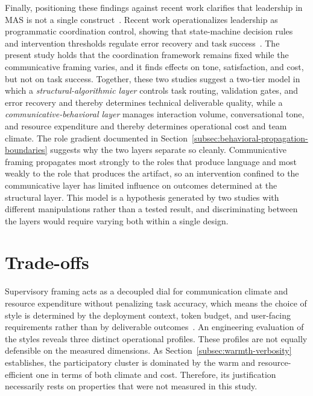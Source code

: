 Finally, positioning these findings against recent work clarifies that leadership in \ac{MAS} is not a single construct~\cite{kwak2026leadershipcoordinationcontrolbehavioral}.
Recent work operationalizes leadership as programmatic coordination control, showing that state-machine decision rules and intervention thresholds regulate error recovery and task success~\cite{kwak2026leadershipcoordinationcontrolbehavioral}.
The present study holds that the coordination framework remains fixed while the communicative framing varies, and it finds effects on tone, satisfaction, and cost, but not on task success.
Together, these two studies suggest a two-tier model in which a \emph{structural-algorithmic layer} controls task routing, validation gates, and error recovery and thereby determines technical deliverable quality, while a \emph{communicative-behavioral layer} manages interaction volume, conversational tone, and resource expenditure and thereby determines operational cost and team climate.
The role gradient documented in Section~\ref{subsec:behavioral-propagation-boundaries} suggests why the two layers separate so cleanly. 
Communicative framing propagates most strongly to the roles that produce language and most weakly to the role that produces the artifact, so an intervention confined to the communicative layer has limited influence on outcomes determined at the structural layer.
This model is a hypothesis generated by two studies with different manipulations rather than a tested result, and discriminating between the layers would require varying both within a single design.

\section{Trade-offs}
\label{sec:trade-offs}

Supervisory framing acts as a decoupled dial for communication climate and resource expenditure without penalizing task accuracy, which means the choice of style is determined by the deployment context, token budget, and user-facing requirements rather than by deliverable outcomes~\cite{kwak2026leadershipcoordinationcontrolbehavioral, zhang2024cutcrapeconomicalcommunication}.
An engineering evaluation of the styles reveals three distinct operational profiles.
These profiles are not equally defensible on the measured dimensions.
As Section~\ref{subsec:warmth-verbosity} establishes, the participatory cluster is dominated by the warm and resource-efficient one in terms of both climate and cost.
Therefore, its justification necessarily rests on properties that were not measured in this study.

